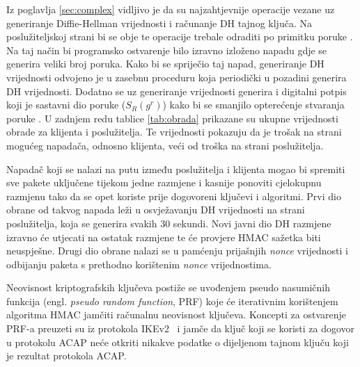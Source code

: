 Iz poglavlja \ref{sec:complex} vidljivo je da su najzahtjevnije operacije
vezane uz generiranje Diffie-Hellman vrijednosti i računanje DH tajnog ključa.
Na poslužiteljskoj strani bi se obje te operacije trebale odraditi po primitku
poruke \initi{}. Na taj način bi programsko ostvarenje bilo izravno izloženo
napadu gdje se generira veliki broj \initi{} poruka. Kako bi se spriječio taj
napad, generiranje DH vrijednosti odvojeno je u zasebnu proceduru koja
periodički u pozadini generira DH vrijednosti. Dodatno se uz generiranje vrijednosti
generira i digitalni potpis koji je sastavni dio poruke \initr{} ($S_R(g^r)$)
kako bi se smanjilo opterećenje stvaranja poruke \initr{}. U zadnjem redu
tablice \ref{tab:obrada} prikazane su ukupne vrijednosti obrade za klijenta i
poslužitelja. Te vrijednosti pokazuju da je trošak na strani mogućeg napadača,
odnosno klijenta, veći od troška na strani poslužitelja.

Napadač koji se nalazi na putu između poslužitelja i klijenta mogao bi spremiti
sve pakete uključene tijekom jedne razmjene i kasnije ponoviti cjelokupnu
razmjenu tako da se opet koriste prije dogovoreni ključevi i algoritmi.
Prvi dio obrane od takvog napada leži u osvježavanju DH vrijednosti na strani
poslužitelja, koja se generira svakih 30 sekundi. Novi javni dio DH razmjene
izravno će utjecati na ostatak razmjene te će provjere HMAC sažetka biti
neuspješne. Drugi dio obrane nalazi se u pamćenju prijašnjih \emph{nonce}
vrijednosti i odbijanju paketa s prethodno korištenim \emph{nonce}
vrijednostima.

Neovisnost kriptografskih ključeva postiže se uvođenjem pseudo nasumičnih
funkcija (engl. \emph{pseudo random function}, PRF) koje će iterativnim
korištenjem algoritma HMAC jamčiti računalnu neovisnost ključeva. Koncepti za
ostvarenje PRF-a preuzeti su iz protokola IKEv2~\cite{rfc5996} i jamče da
ključ koji se koristi za dogovor u protokolu ACAP neće otkriti nikakve podatke o
dijeljenom tajnom ključu koji je rezultat protokola ACAP.

